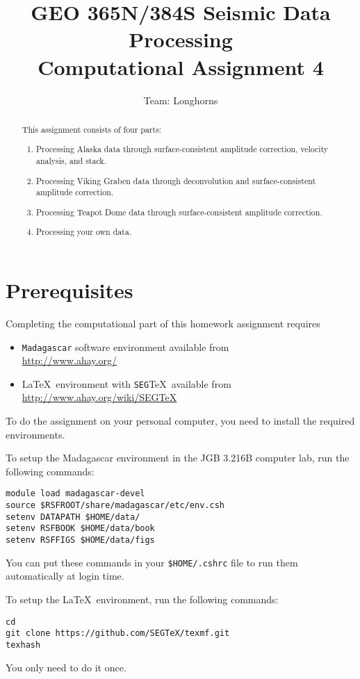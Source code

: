 \author{Team: Longhorns}
\title{GEO 365N/384S Seismic Data Processing \\ Computational Assignment 4}

\begin{abstract}
  This assignment consists of four parts:
  \begin{enumerate}
  \item Processing Alaska data through surface-consistent amplitude correction, velocity analysis, and stack.
  \item Processing Viking Graben data through deconvolution and surface-consistent amplitude correction.
  \item Processing Teapot Dome data through surface-consistent amplitude correction.
  \item Processing your own data.
  \end{enumerate}
\end{abstract}

\section{Prerequisites}

Completing the computational part of this homework assignment requires
\begin{itemize}
\item \texttt{Madagascar} software environment available from \\
\url{http://www.ahay.org/}
\item \LaTeX\ environment with \texttt{SEG}\TeX\ available from \\ 
\url{http://www.ahay.org/wiki/SEGTeX}
\end{itemize}
To do the assignment on your personal computer, you need to install
the required environments. 

To setup the Madagascar environment in the JGB 3.216B computer lab, run the following commands:
\begin{verbatim}
module load madagascar-devel
source $RSFROOT/share/madagascar/etc/env.csh
setenv DATAPATH $HOME/data/
setenv RSFBOOK $HOME/data/book
setenv RSFFIGS $HOME/data/figs
\end{verbatim}
You can put these commands in your \verb+$HOME/.cshrc+ file to run them automatically at login time.

To setup the \LaTeX\ environment, run the following commands:
\begin{verbatim}
cd
git clone https://github.com/SEGTeX/texmf.git
texhash
\end{verbatim}
You only need to do it once.

